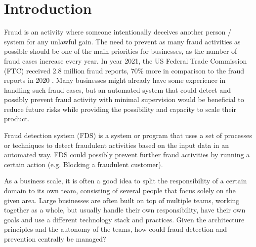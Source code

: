 \chapter{Introduction}

Fraud is an activity where someone intentionally deceives another person / system for any unlawful gain. The need to prevent as many fraud activities as possible should be one of the main priorities for businesses, as the number of fraud cases increase every year. In year 2021, the US Federal Trade Commission (FTC) received 2.8 million fraud reports, 70\% more in comparison to the fraud reports in 2020 \autocite{ftc}. Many businesses might already have some experience in handling such fraud cases, but an automated system that could detect and possibly prevent fraud activity with minimal supervision would be beneficial to reduce future risks while providing the possibility and capacity to scale their product.

Fraud detection system (FDS) is a system or program that uses a set of processes or techniques to detect fraudulent activities based on the input data in an automated way. FDS could possibly prevent further fraud activities by running a certain action (e.g. Blocking a fraudulent customer). 

As a business scale, it is often a good idea to split the responsibility of a certain domain to its own team, consisting of several people that focus solely on the given area. Large businesses are often built on top of multiple teams, working together as a whole, but usually handle their own responsibility, have their own goals and use a different technology stack and practices. Given the architecture principles and the autonomy of the teams, how could fraud detection and prevention centrally be managed?



